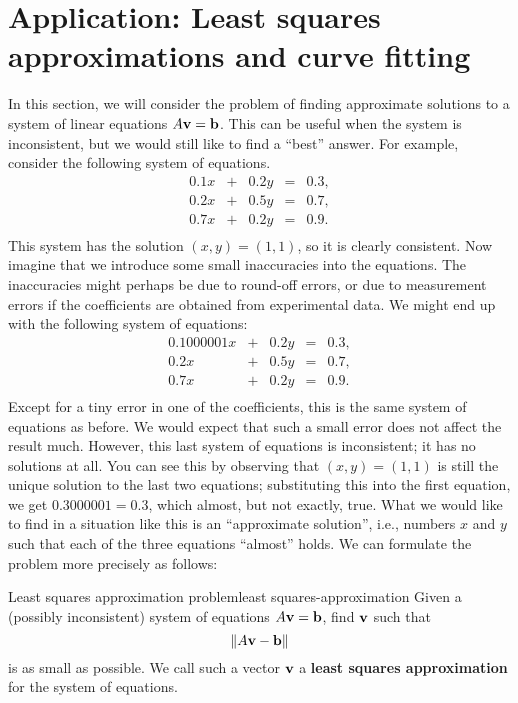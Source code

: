 \section{Application: Least squares approximations and curve fitting}

In this section, we will consider the problem of finding approximate
solutions to a system of linear equations $A\vect{v}=\vect{b}$. This
can be useful when the system is inconsistent, but we would still like
to find a ``best'' answer. For example, consider the following system
of equations.
\begin{equation*}
  \begin{array}{rcrcl}
    0.1 x &+& 0.2 y &=& 0.3, \\
    0.2 x &+& 0.5 y &=& 0.7, \\
    0.7 x &+& 0.2 y &=& 0.9. \\
  \end{array}
\end{equation*}
This system has the solution $(x,y)=(1,1)$, so it is clearly
consistent. Now imagine that we introduce some small inaccuracies into
the equations. The inaccuracies might perhaps be due to round-off
errors, or due to measurement errors if the coefficients are obtained
from experimental data. We might end up with the following system of
equations:
\begin{equation*}
  \begin{array}{rcrcl}
    0.1000001 x &+& 0.2 y &=& 0.3, \\
    0.2 x &+& 0.5 y &=& 0.7, \\
    0.7 x &+& 0.2 y &=& 0.9. \\
  \end{array}
\end{equation*}
Except for a tiny error in one of the coefficients, this is the same
system of equations as before. We would expect that such a small error
does not affect the result much. However, this last system of
equations is inconsistent; it has no solutions at all. You can see
this by observing that $(x,y)=(1,1)$ is still the unique solution to
the last two equations; substituting this into the first equation, we
get $0.3000001 = 0.3$, which almost, but not exactly, true. What we
would like to find in a situation like this is an ``approximate
solution'', i.e., numbers $x$ and $y$ such that each of the three
equations ``almost'' holds. We can formulate the problem more
precisely as follows:

\begin{problem}{Least squares approximation problem}{least squares-approximation}
  Given a (possibly inconsistent) system of equations
  $A\vect{v}=\vect{b}$, find $\vect{v}$ such that
  \begin{equation*}
    \norm{A\vect{v} - \vect{b}}
  \end{equation*}
  is as small as possible. We call such a vector $\vect{v}$ a
  \textbf{least squares approximation}%
   for the system of equations.
\end{problem}

